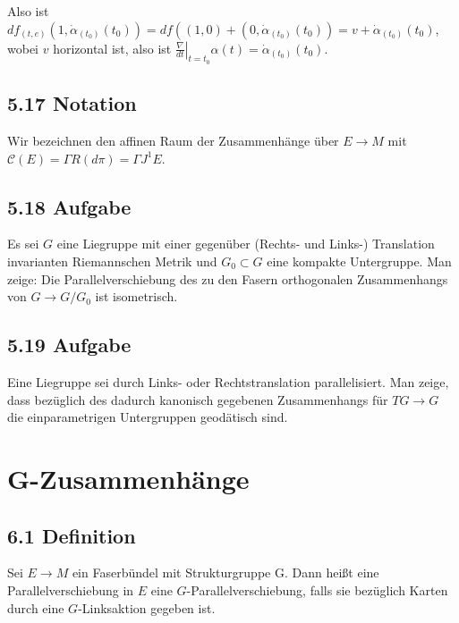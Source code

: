 \documentclass[10pt, letterpaper]{article}
\begin{document}
Also ist $d f_{(t, e)}\left(1, \dot{\alpha}_{\left(t_{0}\right)}\left(t_{0}\right)\right)=d f\left((1,0)+\left(0, \dot{\alpha}_{\left(t_{0}\right)}\left(t_{0}\right)\right)=v+\dot{\alpha}_{\left(t_{0}\right)}\left(t_{0}\right)\right.$, wobei $v$ horizontal ist, also ist $\left.\frac{\nabla}{d t}\right|_{t=t_{0}} \alpha(t)=\dot{\alpha}_{\left(t_{0}\right)}\left(t_{0}\right)$.

\subsection*{5.17 Notation}
Wir bezeichnen den affinen Raum der Zusammenhänge über $E \rightarrow M$ mit $\mathcal{C}(E)=\Gamma R(d \pi)=\Gamma J^{1} E$.

\subsection*{5.18 Aufgabe}
Es sei $G$ eine Liegruppe mit einer gegenüber (Rechts- und Links-) Translation invarianten Riemannschen Metrik und $G_{0} \subset G$ eine kompakte Untergruppe. Man zeige: Die Parallelverschiebung des zu den Fasern orthogonalen Zusammenhangs von $G \rightarrow G / G_{0}$ ist isometrisch.

\subsection*{5.19 Aufgabe}
Eine Liegruppe sei durch Links- oder Rechtstranslation parallelisiert. Man zeige, dass bezüglich des dadurch kanonisch gegebenen Zusammenhangs für $T G \rightarrow G$ die einparametrigen Untergruppen geodätisch sind.



\pagebreak

\section{G-Zusammenhänge}

\subsection*{6.1 Definition}
Sei $E \rightarrow M$ ein Faserbündel mit Strukturgruppe G. Dann heißt eine Parallelverschiebung in $E$ eine $G$-Parallelverschiebung, falls sie bezüglich Karten durch eine $G$-Linksaktion gegeben ist.
\end{document}
